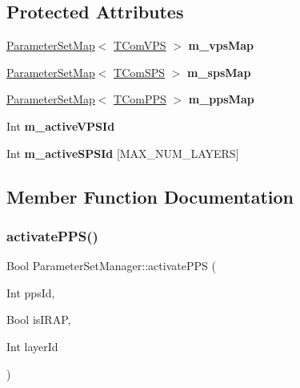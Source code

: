 \subsection*{Protected Attributes}
\begin{DoxyCompactItemize}
\item 
\mbox{\label{class_parameter_set_manager_a1cedd9eb1cd2a28ce2f1726e5950d985}} 
\hyperlink{class_parameter_set_map}{Parameter\+Set\+Map}$<$ \hyperlink{class_t_com_v_p_s}{T\+Com\+V\+PS} $>$ {\bfseries m\+\_\+vps\+Map}
\item 
\mbox{\label{class_parameter_set_manager_a7eb3a92da6ee88817314524e8ac3fd6a}} 
\hyperlink{class_parameter_set_map}{Parameter\+Set\+Map}$<$ \hyperlink{class_t_com_s_p_s}{T\+Com\+S\+PS} $>$ {\bfseries m\+\_\+sps\+Map}
\item 
\mbox{\label{class_parameter_set_manager_adc83b61e141361453fd55b7ba4355ea5}} 
\hyperlink{class_parameter_set_map}{Parameter\+Set\+Map}$<$ \hyperlink{class_t_com_p_p_s}{T\+Com\+P\+PS} $>$ {\bfseries m\+\_\+pps\+Map}
\item 
\mbox{\label{class_parameter_set_manager_a1887f1585520e458164e8aa7ea3e6e2f}} 
Int {\bfseries m\+\_\+active\+V\+P\+S\+Id}
\item 
\mbox{\label{class_parameter_set_manager_aef4b5ffe31419001cbf48ffa41a4ce2c}} 
Int {\bfseries m\+\_\+active\+S\+P\+S\+Id} \mbox{[}M\+A\+X\+\_\+\+N\+U\+M\+\_\+\+L\+A\+Y\+E\+RS\mbox{]}
\end{DoxyCompactItemize}


\subsection{Member Function Documentation}
\mbox{\label{class_parameter_set_manager_a7a8bef7b80abb0b30832c5d4d4d1939c}} 
\subsubsection{\texorpdfstring{activate\+P\+P\+S()}{activatePPS()}}
{\footnotesize\ttfamily Bool Parameter\+Set\+Manager\+::activate\+P\+PS (\begin{DoxyParamCaption}\item[{Int}]{pps\+Id,  }\item[{Bool}]{is\+I\+R\+AP,  }\item[{Int}]{layer\+Id }\end{DoxyParamCaption})}

